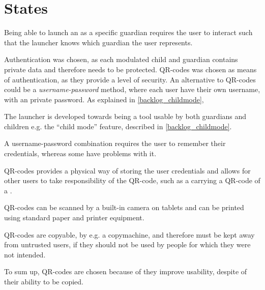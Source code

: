 \section{States}
Being able to launch an \girafapp[] as a specific guardian requires the user to interact such that the launcher knows which guardian the user represents.

Authentication was chosen, as each modulated child and guardian contains private data and therefore needs to be protected. QR-codes was chosen as means of authentication, as they provide a level of security.
An alternative to QR-codes could be a \emph{username-password} method, where each user have their own username, with an private password.
As explained in \autoref{backlog_childmode}, 

The launcher is developed towards being a tool usable by both guardians and children e.g. the ``child mode'' feature, described in \autoref{backlog_childmode}.

A username-password combination requires the user to remember their credentials, whereas some \autists[] have problems with it.

 

QR-codes provides a physical way of storing the user credentials and allows for other users to take responsibility of the QR-code, such as a \guardian[] carrying a QR-code of a \autist[].

QR-codes can be scanned by a built-in camera on tablets and can be printed using standard paper and printer equipment. 

QR-codes are copyable, by e.g. a copymachine, and therefore must be kept away from untrusted users, if they should not be used by people for which they were not intended.

To sum up, QR-codes are chosen because of they improve usability, despite of their ability to be copied.



